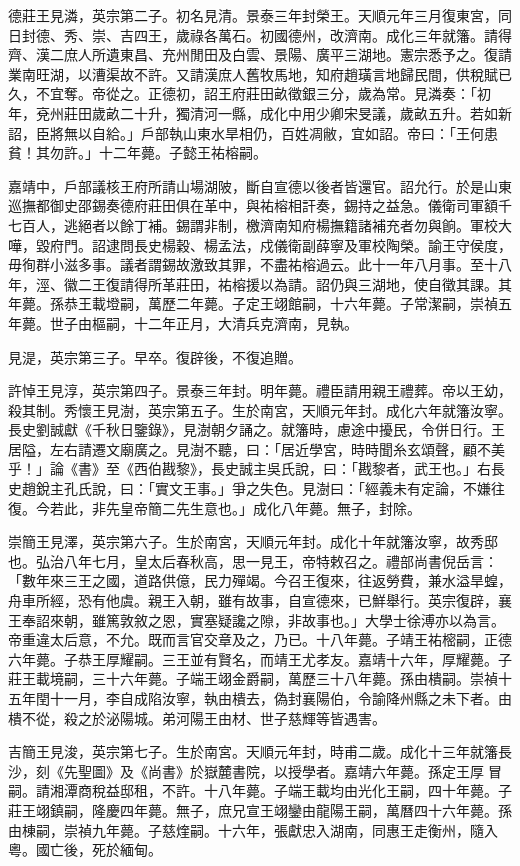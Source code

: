 德莊王見潾，英宗第二子。初名見清。景泰三年封榮王。天順元年三月復東宮，同日封德、秀、崇、吉四王，歲祿各萬石。初國德州，改濟南。成化三年就籓。請得齊、漢二庶人所遺東昌、充州閒田及白雲、景陽、廣平三湖地。憲宗悉予之。復請業南旺湖，以漕渠故不許。又請漢庶人舊牧馬地，知府趙璜言地歸民間，供稅賦已久，不宜奪。帝從之。正德初，詔王府莊田畝徵銀三分，歲為常。見潾奏：「初年，兗州莊田歲畝二十升，獨清河一縣，成化中用少卿宋旻議，歲畝五升。若如新詔，臣將無以自給。」戶部執山東水旱相仍，百姓凋敝，宜如詔。帝曰：「王何患貧！其勿許。」十二年薨。子懿王祐榕嗣。

嘉靖中，戶部議核王府所請山場湖陂，斷自宣德以後者皆還官。詔允行。於是山東巡撫都御史邵錫奏德府莊田俱在革中，與祐榕相訐奏，錫持之益急。儀衛司軍額千七百人，逃絕者以餘丁補。錫謂非制，檄濟南知府楊撫籍諸補充者勿與餉。軍校大嘩，毀府門。詔逮問長史楊穀、楊孟法，戍儀衛副薛寧及軍校陶榮。諭王守侯度，毋徇群小滋多事。議者謂錫故激致其罪，不盡祐榕過云。此十一年八月事。至十八年，涇、徽二王復請得所革莊田，祐榕援以為請。詔仍與三湖地，使自徵其課。其年薨。孫恭王載墱嗣，萬歷二年薨。子定王翊館嗣，十六年薨。子常潔嗣，崇禎五年薨。世子由樞嗣，十二年正月，大清兵克濟南，見執。

見湜，英宗第三子。早卒。復辟後，不復追贈。

許悼王見淳，英宗第四子。景泰三年封。明年薨。禮臣請用親王禮葬。帝以王幼，殺其制。秀懷王見澍，英宗第五子。生於南宮，天順元年封。成化六年就籓汝寧。長史劉誠獻《千秋日鑒錄》，見澍朝夕誦之。就籓時，慮途中擾民，令併日行。王居隘，左右請遷文廟廣之。見澍不聽，曰：「居近學宮，時時聞糸玄頌聲，顧不美乎！」論《書》至《西伯戡黎》，長史誠主吳氏說，曰：「戡黎者，武王也。」右長史趙銳主孔氏說，曰：「實文王事。」爭之失色。見澍曰：「經義未有定論，不嫌往復。今若此，非先皇帝簡二先生意也。」成化八年薨。無子，封除。

崇簡王見澤，英宗第六子。生於南宮，天順元年封。成化十年就籓汝寧，故秀邸也。弘治八年七月，皇太后春秋高，思一見王，帝特敕召之。禮部尚書倪岳言：「數年來三王之國，道路供億，民力殫竭。今召王復來，往返勞費，兼水溢旱蝗，舟車所經，恐有他虞。親王入朝，雖有故事，自宣德來，已鮮舉行。英宗復辟，襄王奉詔來朝，雖篤敦敘之恩，實塞疑讒之隙，非故事也。」大學士徐溥亦以為言。帝重違太后意，不允。既而言官交章及之，乃已。十八年薨。子靖王祐樒嗣，正德六年薨。子恭王厚耀嗣。三王並有賢名，而靖王尤孝友。嘉靖十六年，厚耀薨。子莊王載境嗣，三十六年薨。子端王翊金爵嗣，萬歷三十八年薨。孫由樻嗣。崇禎十五年閏十一月，李自成陷汝寧，執由樻去，偽封襄陽伯，令諭降州縣之未下者。由樻不從，殺之於泌陽城。弟河陽王由材、世子慈輝等皆遇害。

吉簡王見浚，英宗第七子。生於南宮。天順元年封，時甫二歲。成化十三年就籓長沙，刻《先聖圖》及《尚書》於嶽麓書院，以授學者。嘉靖六年薨。孫定王厚冒嗣。請湘潭商稅益邸租，不許。十八年薨。子端王載均由光化王嗣，四十年薨。子莊王翊鎮嗣，隆慶四年薨。無子，庶兄宣王翊鑾由龍陽王嗣，萬曆四十六年薨。孫由棟嗣，崇禎九年薨。子慈煃嗣。十六年，張獻忠入湖南，同惠王走衡州，隨入粵。國亡後，死於緬甸。

